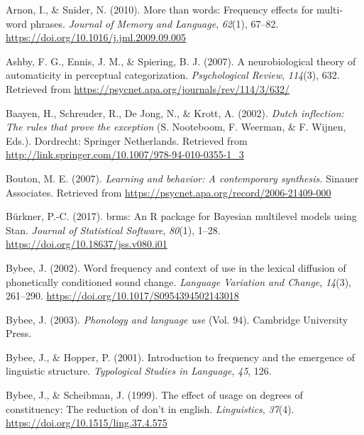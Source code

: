 \documentclass[
  man,floatsintext]{apa6}
\newlength{\cslhangindent}
\newenvironment{CSLReferences}[2] %
 {\begin{list}{}{%
  \setlength{\itemindent}{0pt}
  \setlength{\leftmargin}{0pt}
  \setlength{\parsep}{0pt}
  \ifodd #1
   \setlength{\leftmargin}{\cslhangindent}
   \setlength{\itemindent}{-1\cslhangindent}
  \fi
  \setlength{\itemsep}{#2\baselineskip}}}
 {\end{list}}
\begin{document}
\label{refs}
\begin{CSLReferences}{1}{0}
Arnon, I., \& Snider, N. (2010). More than words: Frequency effects for multi-word phrases. \emph{Journal of Memory and Language}, \emph{62}(1), 67--82. \url{https://doi.org/10.1016/j.jml.2009.09.005}

Ashby, F. G., Ennis, J. M., \& Spiering, B. J. (2007). A neurobiological theory of automaticity in perceptual categorization. \emph{Psychological Review}, \emph{114}(3), 632. Retrieved from \url{https://psycnet.apa.org/journals/rev/114/3/632/}

Baayen, H., Schreuder, R., De Jong, N., \& Krott, A. (2002). \emph{Dutch inflection: The rules that prove the exception} (S. Nooteboom, F. Weerman, \& F. Wijnen, Eds.). Dordrecht: Springer Netherlands. Retrieved from \url{http://link.springer.com/10.1007/978-94-010-0355-1_3}

Bouton, M. E. (2007). \emph{Learning and behavior: A contemporary synthesis.} Sinauer Associates. Retrieved from \url{https://psycnet.apa.org/record/2006-21409-000}

Bürkner, P.-C. (2017). {brms}: An {R} package for {Bayesian} multilevel models using {Stan}. \emph{Journal of Statistical Software}, \emph{80}(1), 1--28. \url{https://doi.org/10.18637/jss.v080.i01}

Bybee, J. (2002). Word frequency and context of use in the lexical diffusion of phonetically conditioned sound change. \emph{Language Variation and Change}, \emph{14}(3), 261--290. \url{https://doi.org/10.1017/S0954394502143018}

Bybee, J. (2003). \emph{Phonology and language use} (Vol. 94). Cambridge University Press.

Bybee, J., \& Hopper, P. (2001). Introduction to frequency and the emergence of linguistic structure. \emph{Typological Studies in Language}, \emph{45}, 126.

Bybee, J., \& Scheibman, J. (1999). The effect of usage on degrees of constituency: The reduction of don't in english. \emph{Linguistics}, \emph{37}(4). \url{https://doi.org/10.1515/ling.37.4.575}


\end{CSLReferences}
\end{document}
